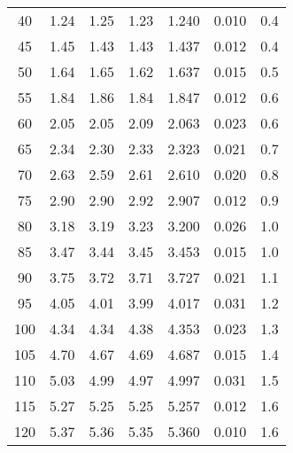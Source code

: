 \begin{table}[H]
{\begin{tabular}{
      S[table-format=3.0] 
      S[table-format=1.3] S[table-format=1.3] S[table-format=1.3]
      S[table-format=1.4] S[table-format=1.4] S[table-format=1.3]
      }
      40  & 1.24  & 1.25  &  1.23  &  1.240  & 0.010 & 0.4   \\
      45  & 1.45  & 1.43  &  1.43  &  1.437  & 0.012 & 0.4   \\
      50  & 1.64  & 1.65  &  1.62  &  1.637  & 0.015 & 0.5   \\
      55  & 1.84  & 1.86  &  1.84  &  1.847  & 0.012 & 0.6   \\
      60  & 2.05  & 2.05  &  2.09  &  2.063  & 0.023 & 0.6   \\
      65  & 2.34  & 2.30  &  2.33  &  2.323  & 0.021 & 0.7   \\
      70  & 2.63  & 2.59  &  2.61  &  2.610  & 0.020 & 0.8   \\
      75  & 2.90  & 2.90  &  2.92  &  2.907  & 0.012 & 0.9   \\
      80  & 3.18  & 3.19  &  3.23  &  3.200  & 0.026 & 1.0   \\
      85  & 3.47  & 3.44  &  3.45  &  3.453  & 0.015 & 1.0   \\
      90  & 3.75  & 3.72  &  3.71  &  3.727  & 0.021 & 1.1   \\
      95  & 4.05  & 4.01  &  3.99  &  4.017  & 0.031 & 1.2   \\
      100 & 4.34  & 4.34  &  4.38  &  4.353  & 0.023 & 1.3   \\
      105 & 4.70  & 4.67  &  4.69  &  4.687  & 0.015 & 1.4   \\
      110 & 5.03  & 4.99  &  4.97  &  4.997  & 0.031 & 1.5   \\
      115 & 5.27  & 5.25  &  5.25  &  5.257  & 0.012 & 1.6   \\
      120 & 5.37  & 5.36  &  5.35  &  5.360  & 0.010 & 1.6   \\
      \bottomrule 
    \end{tabular}
    }
\end{table}
%

